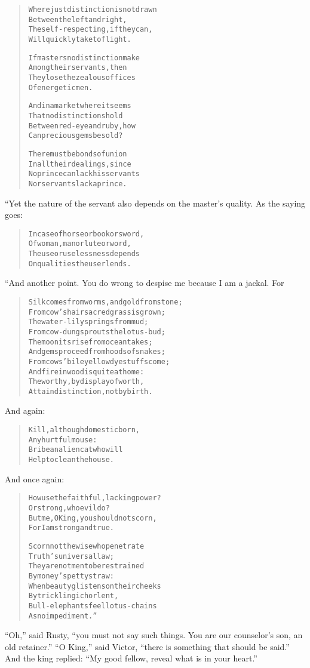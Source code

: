 \documentclass[article, twoside, 14pt]{memoir}
\renewenvironment{verbatim}{%
\begin{quote}%
\vskip -10pt%
\begin{alltt}\normalfont\large}{\end{alltt}%
\end{quote}%
\vskip -10pt
} %
\begin{document}
\begin{verbatim}
Where just distinction is not drawn
    Between the left and right,
The self-respecting, if they can,
    Will quickly take to flight.

If masters no distinction make
    Among their servants, then
They lose the zealous offices
    Of energetic men.

And in a market where it seems
    That no distinctions hold
Between red-eye and ruby, how
    Can precious gems be sold?

There must be bonds of union
    In all their dealings, since
No prince can lack his servants
    Nor servants lack a prince.
\end{verbatim}
“Yet the nature of the servant also depends on the master's
quality. As the saying goes:

\begin{verbatim}
In case of horse or book or sword,
Of woman, man or lute or word,
The use or uselessness depends
On qualities the user lends.
\end{verbatim}
“And another point. You do wrong to despise me because I am a
jackal. For

\begin{verbatim}
Silk comes from worms, and gold from stone;
From cow's hair sacred grass is grown;
The water-lily springs from mud;
From cow-dung sprouts the lotus-bud;
The moon its rise from ocean takes;
And gems proceed from hoods of snakes;
From cows' bile yellow dyestuffs come;
And fire in wood is quite at home:
The worthy, by display of worth,
Attain distinction, not by birth.
\end{verbatim}
And again:

\begin{verbatim}
Kill, although domestic born,
    Any hurtful mouse:
Bribe an alien cat who will
    Help to clean the house.
\end{verbatim}
And once again:

\begin{verbatim}
How use the faithful, lacking power?
    Or strong, who evil do?
But me, O King, you should not scorn,
    For I am strong and true.

Scorn not the wise who penetrate
    Truth's universal law;
They are not men to be restrained
    By money's petty straw:
When beauty glistens on their cheeks
    By trickling ichor lent,
Bull-elephants feel lotus-chains
    As no impediment.”
\end{verbatim}
``Oh,'' said Rusty,
``you must not say such things. You are our counselor's son, an old retainer.''
``O King,'' said Victor,
``there is something that should be said.'' And the king replied:
``My good fellow, reveal what is in your heart.''
\end{document}
